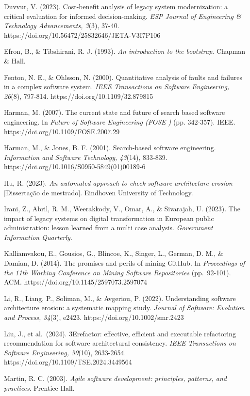 \documentclass[
  a4paper,
]{article}
\begin{document}
Duvvur, V. (2023). Cost-benefit analysis of legacy system modernization: a critical evaluation for informed decision-making. \emph{ESP Journal of Engineering \& Technology Advancements, 3}(3), 37-40. https://doi.org/10.56472/25832646/JETA-V3I7P106

Efron, B., \& Tibshirani, R. J. (1993). \emph{An introduction to the bootstrap}. Chapman \& Hall.

Fenton, N. E., \& Ohlsson, N. (2000). Quantitative analysis of faults and failures in a complex software system. \emph{IEEE Transactions on Software Engineering, 26}(8), 797-814. https://doi.org/10.1109/32.879815

Harman, M. (2007). The current state and future of search based software engineering. In \emph{Future of Software Engineering (FOSE )} (pp. 342-357). IEEE. https://doi.org/10.1109/FOSE.2007.29

Harman, M., \& Jones, B. F. (2001). Search-based software engineering. \emph{Information and Software Technology, 43}(14), 833-839. https://doi.org/10.1016/S0950-5849(01)00189-6

Hu, R. (2023). \emph{An automated approach to check software architecture erosion} {[}Dissertação de mestrado{]}. Eindhoven University of Technology.

Irani, Z., Abril, R. M., Weerakkody, V., Omar, A., \& Sivarajah, U. (2023). The impact of legacy systems on digital transformation in European public administration: lesson learned from a multi case analysis. \emph{Government Information Quarterly}.

Kalliamvakou, E., Gousios, G., Blincoe, K., Singer, L., German, D. M., \& Damian, D. (2014). The promises and perils of mining GitHub. In \emph{Proceedings of the 11th Working Conference on Mining Software Repositories} (pp.~92-101). ACM. https://doi.org/10.1145/2597073.2597074

Li, R., Liang, P., Soliman, M., \& Avgeriou, P. (2022). Understanding software architecture erosion: a systematic mapping study. \emph{Journal of Software: Evolution and Process, 34}(3), e2423. https://doi.org/10.1002/smr.2423

Liu, J., et al.~(2024). 3Erefactor: effective, efficient and executable refactoring recommendation for software architectural consistency. \emph{IEEE Transactions on Software Engineering, 50}(10), 2633-2654. https://doi.org/10.1109/TSE.2024.3449564

Martin, R. C. (2003). \emph{Agile software development: principles, patterns, and practices}. Prentice Hall.
\end{document}
